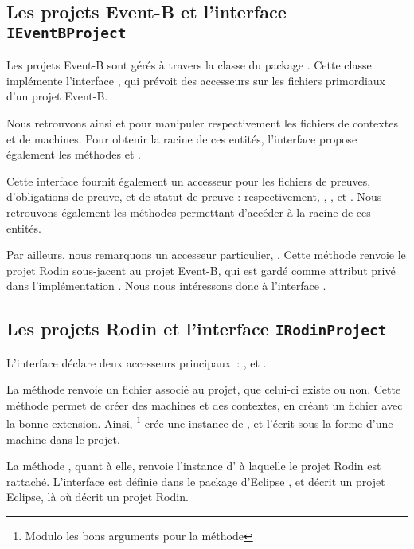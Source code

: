 \subsection{Les projets Event-B et l'interface \texttt{IEventBProject}}

Les projets Event-B sont gérés à travers la classe  du package .
Cette classe implémente l'interface , qui prévoit des accesseurs sur les fichiers primordiaux d'un projet Event-B.

Nous retrouvons ainsi  et  pour manipuler respectivement les fichiers de contextes et de machines.
Pour obtenir la racine de ces entités, l'interface propose également les méthodes  et .

Cette interface fournit également un accesseur pour les fichiers de preuves, d'obligations de preuve, et de statut de preuve : respectivement, %
, , et .
Nous retrouvons également les méthodes permettant d'accéder à la racine de ces entités.

Par ailleurs, nous remarquons un accesseur particulier, .
Cette méthode renvoie le projet Rodin sous-jacent au projet Event-B, qui est gardé comme attribut privé  dans l'implémentation .
Nous nous intéressons donc à l'interface .


\subsection{Les projets Rodin et l'interface \texttt{IRodinProject}}

L'interface  déclare deux accesseurs principaux~: , et .

La méthode  renvoie un fichier associé au projet, que celui-ci existe ou non.
Cette méthode permet de créer des machines et des contextes, en créant un fichier avec la bonne extension.
Ainsi, \footnote{Modulo les bons arguments pour la méthode } crée une instance de , %
et l'écrit sous la forme d'une machine dans le projet.

La méthode , quant à elle, renvoie l'instance d' à laquelle le projet Rodin est rattaché.
L'interface  est définie dans le package d'Eclipse , et décrit un projet Eclipse, là où  décrit un projet Rodin.
